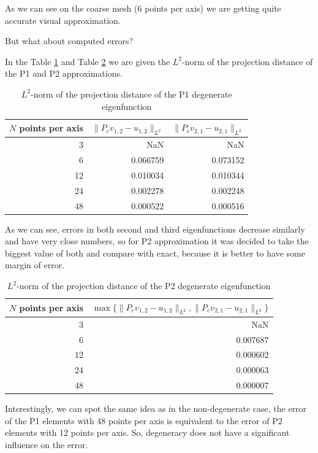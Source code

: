 \documentclass[acmsmall,screen]{MapleTrans}
\begin{document}
As we can see on the coarse mesh (6 points per axis) we are getting quite accurate visual approximation.

But what about computed errors?

In the Table \ref{tab:projection errors P1} and Table \ref{tab:projection errors P2} we are given the $L^2$-norm of the projection distance of the P1 and P2 approximations.
\begin{table}[H]
    \centering
    \caption{$L^2$-norm of the projection distance of the P1 degenerate eigenfunction}
    \label{tab:projection errors P1}
    \begin{tabular}{rrr}
        \toprule
        $N$ points per axis & $\|P_ev_{1,2} - u_{1,2}\|_{L^2}$ & $\|P_ev_{2,1} - u_{2,1}\|_{L^2}$ \\
        \midrule
        3 & NaN & NaN \\
        6 & 0.066759 & 0.073152 \\
        12 & 0.010034 & 0.010344 \\
        24 & 0.002278 & 0.002248 \\
        48 & 0.000522 & 0.000516 \\
        \bottomrule
    \end{tabular}
\end{table}
As we can see, errors in both second and third eigenfunctions decrease similarly and have very close numbers, so for P2 approximation it was decided to take the biggest value of both and compare with exact, because it is better to have some margin of error. 
\begin{table}[H]
    \centering
    \caption{$L^2$-norm of the projection distance of the P2 degenerate eigenfunction}
    \label{tab:projection errors P2}
    \begin{tabular}{rr}
        \toprule
        $N$ points per axis & $\max\{\|P_ev_{1,2} - u_{1,2}\|_{L^2}, \|P_ev_{2,1} - u_{2,1}\|_{L^2}\}$ \\
        \midrule
        3 & NaN \\
        6 & 0.007687 \\
        12 & 0.000602 \\
        24 & 0.000063 \\
        48 & 0.000007 \\
        \bottomrule
    \end{tabular}
\end{table}

Interestingly, we can spot the same idea as in the non-degenerate case, the error of the P1 elements with 48 points per axis is equivalent to the error of P2 elements with 12 points per axis. 
So, degeneracy does not have a significant influence on the error.
\end{document}
